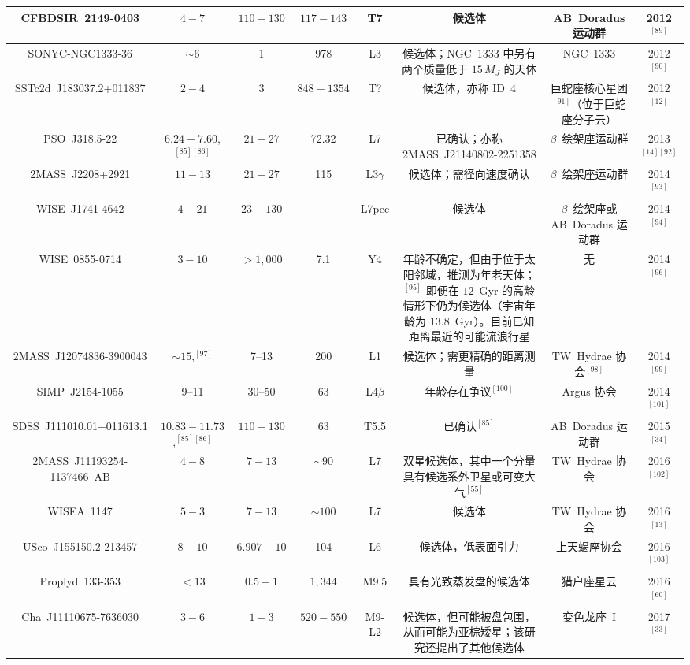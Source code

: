 \begin{table}[ht]
\begin{tabular}{|c|c|c|c|c|c|c|c|}
\hline
CFBDSIR~2149-0403 & $4-7$ & $110-130$ & $117-143$ & T7 & 候选体 & AB~Doradus 运动群 & 2012$^{[89]}$\\
\hline
SONYC-NGC1333-36 & $\sim6$ & 1 & 978 & L3 & 候选体；NGC~1333 中另有两个质量低于 $15\,M_J$ 的天体 & NGC~1333 & 2012$^{[90]}$\\
\hline
SSTc2d~J183037.2+011837 & $2-4$ & 3 & $848-1354$ & T? & 候选体，亦称 ID~4  & 巨蛇座核心星团$^{[91]}$（位于巨蛇座分子云） & 2012$^{[12]}$\\
\hline
PSO~J318.5-22 & $6.24-7.60$,$^{[85][86]}$ & $21-27$ & 72.32 & L7 & 已确认；亦称 2MASS~J21140802-2251358 & $\beta$~绘架座运动群 & 2013$^{[14][92]}$\\
\hline
2MASS~J2208+2921 & $11-13$  & $21-27$ & 115 & L3$\gamma$ & 候选体；需径向速度确认 & $\beta$~绘架座运动群 & 2014$^{[93]}$\\
\hline
WISE~J1741-4642 & $4-21$ & $23-130$ &  & L7pec  & 候选体  & $\beta$~绘架座或 AB~Doradus 运动群 & 2014$^{[94]}$\\
\hline
WISE~0855-0714 & $3-10$ & $>1{,}000$ & 7.1 & Y4 & 年龄不确定，但由于位于太阳邻域，推测为年老天体；$^{[95]}$ 即便在 $12$~Gyr 的高龄情形下仍为候选体（宇宙年龄为 $13.8$~Gyr）。目前已知距离最近的可能流浪行星 & 无 & 2014$^{[96]}$\\
\hline
2MASS~J12074836-3900043 & $\sim15$,$^{[97]}$ & 7--13 & 200 & L1 & 候选体；需更精确的距离测量 & TW~Hydrae 协会$^{[98]}$ & 2014$^{[99]}$\\
\hline
SIMP~J2154-1055 & 9--11 & 30--50 & 63 & L4$\beta$ & 年龄存在争议$^{[100]}$ & Argus 协会 & 2014$^{[101]}$\\
\hline
SDSS~J111010.01+011613.1 & $10.83-11.73$,$^{[85][86]}$ & $110-130$ & 63 & T5.5 & 已确认$^{[85]}$ & AB~Doradus 运动群 & 2015$^{[34]}$\\
\hline
2MASS~J11193254-1137466~AB & $4-8$ & $7-13$ & $\sim90$ & L7 & 双星候选体，其中一个分量具有候选系外卫星或可变大气$^{[55]}$ & TW~Hydrae 协会 & 2016$^{[102]}$\\
\hline
WISEA~1147 & $5-3 $& $7-13$ & $\sim100$ & L7 & 候选体 & TW~Hydrae 协会  & 2016$^{[13]}$\\
\hline
USco~J155150.2-213457 & $8-10$ & $6.907-10$ & 104 & L6 & 候选体，低表面引力 &上天蝎座协会 & 2016$^{[103]}$\\
\hline
Proplyd~133-353 & $<13$ & $0.5-1$ & $1{,}344$ & M9.5 & 具有光致蒸发盘的候选体 & 猎户座星云 & 2016$^{[60]}$\\
\hline
Cha~J11110675-7636030 & $3-6$ & $1-3$ & $520-550$  & M9-L2 & 候选体，但可能被盘包围，从而可能为亚棕矮星；该研究还提出了其他候选体 & 变色龙座~I & 2017$^{[33]}$\\

\end{tabular}
\end{table}
